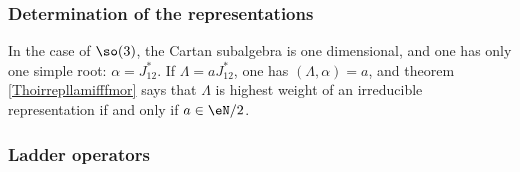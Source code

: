 					\subsubsection{Determination of the representations}

In the case of $\so(3)$, the Cartan subalgebra is one dimensional, and one has only one simple root: $\alpha=J_{12}^*$. If $\Lambda=aJ_{12}^*$, one has $(\Lambda,\alpha)=a$, and theorem \ref{Thoirrepllamifffmor} says that $\Lambda$ is highest weight of an irreducible representation if and only if $a\in \eN/2$.

					\subsubsection{Ladder operators}

